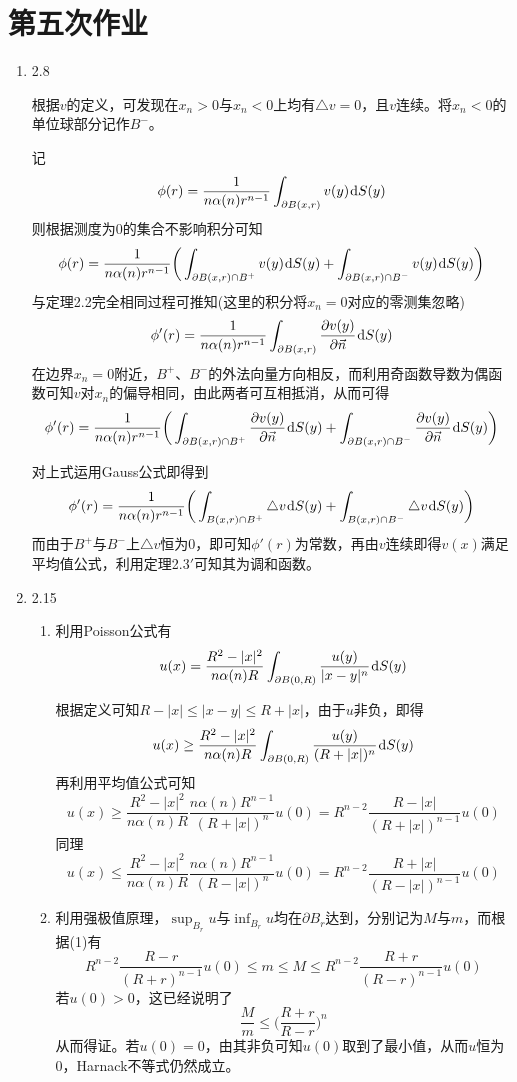 \documentclass[a4paper,UTF8,fontset=windows,10pt]{ctexart}
\newcommand*{\dr}{\hspace{0.07em}\mathrm{d}}
\begin{document}
\section{第五次作业}
\begin{enumerate}
    \item 2.8
    
    根据$v$的定义，可发现在$x_n>0$与$x_n<0$上均有$\triangle v=0$，且$v$连续。将$x_n<0$的单位球部分记作$B^-$。
    
    记
    $$\phi(r)=\frac{1}{n\alpha(n)r^{n-1}}\int_{\partial B(x,r)}v(y)\dr S(y)$$
    则根据测度为0的集合不影响积分可知
    $$\phi(r)=\frac{1}{n\alpha(n)r^{n-1}}\bigg(\int_{\partial B(x,r)\cap B^+}v(y)\dr S(y)+\int_{\partial B(x,r)\cap B^-}v(y)\dr S(y)\bigg)$$
    与定理2.2完全相同过程可推知(这里的积分将$x_n=0$对应的零测集忽略)
    $$\phi'(r)=\frac{1}{n\alpha(n)r^{n-1}}\int_{\partial B(x,r)}\frac{\partial v(y)}{\partial\vec{n}}\dr S(y)$$
    在边界$x_n=0$附近，$B^+$、$B^-$的外法向量方向相反，而利用奇函数导数为偶函数可知$v$对$x_n$的偏导相同，由此两者可互相抵消，从而可得
    $$\phi'(r)=\frac{1}{n\alpha(n)r^{n-1}}\bigg(\int_{\partial B(x,r)\cap B^+}\frac{\partial v(y)}{\partial\vec{n}}\dr S(y)+\int_{\partial B(x,r)\cap B^-}\frac{\partial v(y)}{\partial\vec{n}}\dr S(y)\bigg)$$
    
    对上式运用Gauss公式即得到
    $$\phi'(r)=\frac{1}{n\alpha(n)r^{n-1}}\bigg(\int_{B(x,r)\cap B^+}\triangle v\dr S(y)+\int_{B(x,r)\cap B^-}\triangle v\dr S(y)\bigg)$$
    而由于$B^+$与$B^-$上$\triangle v$恒为0，即可知$\phi'(r)$为常数，再由$v$连续即得$v(x)$满足平均值公式，利用定理2.3$'$可知其为调和函数。
    
    \item 2.15
    \begin{enumerate}[(1)]
        \item 利用Poisson公式有
        $$u(x)=\frac{R^2-|x|^2}{n\alpha(n)R}\int_{\partial B(0,R)}\frac{u(y)}{|x-y|^n}\dr S(y)$$
        
        根据定义可知$R-|x|\le |x-y|\le R+|x|$，由于$u$非负，即得
        $$u(x)\ge\frac{R^2-|x|^2}{n\alpha(n)R}\int_{\partial B(0,R)}\frac{u(y)}{(R+|x|)^n}\dr S(y)$$
        再利用平均值公式可知
        $$u(x)\ge\frac{R^2-|x|^2}{n\alpha(n)R}\frac{n\alpha(n)R^{n-1}}{(R+|x|)^n}u(0)=R^{n-2}\frac{R-|x|}{(R+|x|)^{n-1}}u(0)$$
        同理
        $$u(x)\le\frac{R^2-|x|^2}{n\alpha(n)R}\frac{n\alpha(n)R^{n-1}}{(R-|x|)^n}u(0)=R^{n-2}\frac{R+|x|}{(R-|x|)^{n-1}}u(0)$$
    
        \item 利用强极值原理，$\sup_{B_r}u$与$\inf_{B_r}u$均在$\partial B_r$达到，分别记为$M$与$m$，而根据(1)有
        $$R^{n-2}\frac{R-r}{(R+r)^{n-1}}u(0)\le m\le M\le R^{n-2}\frac{R+r}{(R-r)^{n-1}}u(0)$$
        若$u(0)>0$，这已经说明了
        $$\frac{M}{m}\le\bigg(\frac{R+r}{R-r}\bigg)^n$$
        从而得证。若$u(0)=0$，由其非负可知$u(0)$取到了最小值，从而$u$恒为0，Harnack不等式仍然成立。
    \end{enumerate}
    

\end{enumerate}
\end{document}
